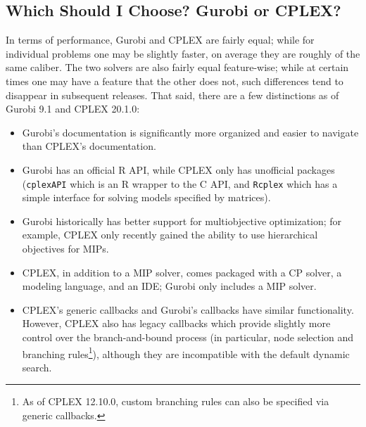 \documentclass[12pt]{article}
\begin{document}
\subsection{Which Should I Choose? Gurobi or CPLEX?}
In terms of performance, Gurobi and CPLEX are fairly equal; while for individual problems one may be slightly faster, on average they are roughly of the same caliber.
The two solvers are also fairly equal feature-wise; while at certain times one may have a feature that the other does not, such differences tend to disappear in subsequent releases. 
That said, there are a few distinctions as of Gurobi 9.1 and CPLEX 20.1.0:
\begin{itemize}
    \item Gurobi's documentation is significantly more organized and easier to navigate than CPLEX's documentation.
    \item Gurobi has an official R API, while CPLEX only has unofficial packages (\texttt{cplexAPI} which is an R wrapper to the C API, and \texttt{Rcplex} which has a simple interface for solving models specified by matrices).
    \item Gurobi historically has better support for multiobjective optimization; for example, CPLEX only recently gained the ability to use hierarchical objectives for MIPs.
    \item CPLEX, in addition to a MIP solver, comes packaged with a CP solver, a modeling language, and an IDE; Gurobi only includes a MIP solver.
    \item CPLEX's generic callbacks and Gurobi's callbacks have similar functionality.
        However, CPLEX also has legacy callbacks which provide slightly more control over the branch-and-bound process (in particular, node selection and branching rules\footnote{
            As of CPLEX 12.10.0, custom branching rules can also be specified via generic callbacks.
        }), although they are incompatible with the default dynamic search.
\end{itemize}




\end{document}
